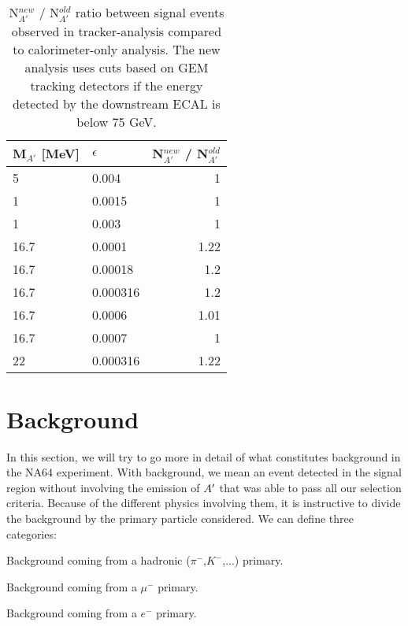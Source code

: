 \begin{table}[h!]
  \centering
  \begin{tabular}{|llr|}
    \hline
    M$_{A'}$ [MeV]& $\epsilon$ & N$^{new}_{A'}$ / N$^{old}_{A'}$ \\    
    \hline
    5    & 0.004    & 1   \\    
    1    & 0.0015   & 1   \\    
    1    & 0.003    & 1   \\    
    16.7 & 0.0001   & 1.22\\
    16.7 & 0.00018  & 1.2 \\    
    16.7 & 0.000316 & 1.2 \\
    16.7 & 0.0006   & 1.01\\
    16.7 & 0.0007   & 1   \\
    22   & 0.000316 & 1.22\\
    \hline    
  \end{tabular}
  \caption[ratio between signal events observed in tracker-analysis compared to calorimeter-only analysis]{N$^{new}_{A'}$ / N$^{old}_{A'}$ ratio between signal events observed in tracker-analysis compared to calorimeter-only analysis. The new analysis uses cuts based on GEM tracking detectors if the energy detected by the downstream ECAL is below 75 GeV.}
  \label{tab:dm:efftable}
\end{table}

\section{Background}
\label{ch3:sec:bkg}

In this section, we will try to go more in detail of what constitutes background in the NA64 experiment. With background, we mean an event detected in the signal region without involving the emission of $A'$ that was able to pass all our selection criteria. Because of the different physics involving them, it is instructive to divide the background by the primary particle considered. We can define three categories:

\begin{description}[leftmargin=!,labelwidth=\widthof{\bfseries Electronic background}]
\item[Hadronic background] Background coming from a hadronic ($\pi^-$,$K^-$,...) primary.
\item[Muonic background] Background coming from a $\mu^-$ primary.
\item[Electronic background] Background coming from a $e^-$ primary.
\end{description}

